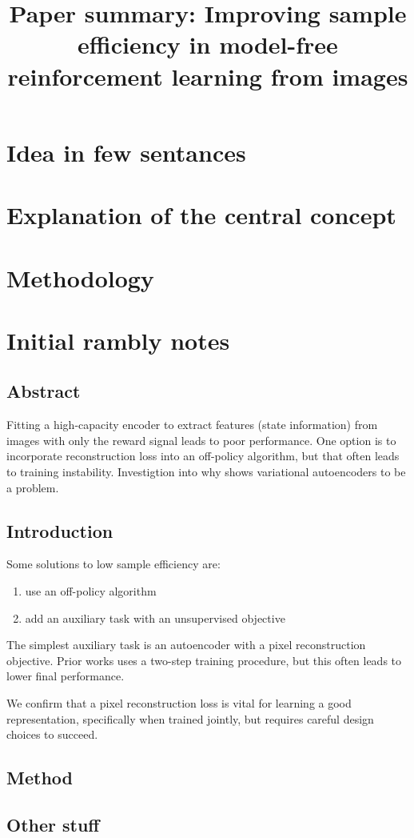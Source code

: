\documentclass{article}
\title{Paper summary: Improving sample efficiency in model-free reinforcement learning from images}
\begin{document}
\maketitle


\section{Idea in few sentances}


\section{Explanation of the central concept}


\section{Methodology}


\section{Initial rambly notes}


\subsection{Abstract}
Fitting a high-capacity encoder to extract features (state information)
from images with only the reward signal leads to poor performance.
One option is to incorporate reconstruction loss into an off-policy algorithm,
but that often leads to training instability.
Investigtion into why shows variational autoencoders to be a problem.

\subsection{Introduction}
Some solutions to low sample efficiency are:
\begin{enumerate}
		\item use an off-policy algorithm
		\item add an auxiliary task with an unsupervised objective
\end{enumerate}
The simplest auxiliary task is an autoencoder with a pixel reconstruction objective.
Prior works uses a two-step training procedure,
but this often leads to lower final performance.
\begin{displayquote}
	We confirm that a pixel reconstruction loss is vital for learning a good
	representation, specifically when trained jointly,
	but requires careful design choices to succeed.
\end{displayquote}


\subsection{Method}

\subsection{Other stuff}
\end{document}
